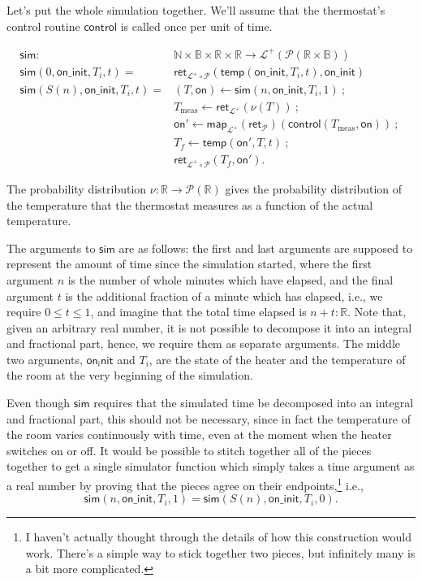 \documentclass{article}           %
\newcommand{\R}{\mathbb{R}}
\newcommand{\nat}{\mathbb{N}}
\newcommand{\bool}{\mathbb{B}}
\newcommand{\Prob}{\mathcal{P}}
\newcommand{\PLower}{\mathcal{L}^+}
\newcommand{\map}[1]{\mathsf{map}_{#1}}
\newcommand{\ret}[1]{\mathsf{ret}_{#1}}
\newcommand{\then}{\ ;\ }
\begin{document}
Let's put the whole simulation together. We'll assume that the thermostat's control routine $\mathsf{control}$ is called once per unit of time.

\begin{align*}
\mathsf{sim} :\ & \nat \times \bool \times \R \times \R \to \PLower(\Prob(\R \times \bool))
\\
\mathsf{sim}(0, \mathsf{on\_init}, T_i, t) = 
  &\ret{\PLower \circ \Prob}(\mathsf{temp}(\mathsf{on\_init}, T_i, t), \mathsf{on\_init})
\\
\mathsf{sim}(S(n), \mathsf{on\_init}, T_i, t) = 
&(T, \mathsf{on}) \leftarrow \mathsf{sim}(n, \mathsf{on\_init}, T_i, 1)
 \then
 \\&T_\text{meas} \leftarrow \ret{\PLower}(\nu(T))
 \then
 \\ &\mathsf{on}' \leftarrow \map{\PLower}(\ret{\Prob})(\mathsf{control}(T_\text{meas}, \mathsf{on}))
 \then
 \\ &T_f \leftarrow \mathsf{temp}(\mathsf{on'}, T, t)
 \then
 \\ &\ret{\PLower \circ \Prob}(T_f, \mathsf{on'}).
\end{align*}

The probability distribution $\nu : \R \to \Prob(\R)$ gives the probability distribution of the temperature that the thermostat measures as a function of the actual temperature.

The arguments to $\mathsf{sim}$ are as follows: the first and last arguments are supposed to represent the amount of time since the simulation started, where the first argument $n$ is the number of whole minutes which have elapsed, and the final argument $t$ is the additional fraction of a minute which has elapsed, i.e., we require $0 \le t \le 1$, and imagine that the total time elapsed is $n + t : \R$. Note that, given an arbitrary real number, it is not possible to decompose it into an integral and fractional part, hence, we require them as separate arguments. The middle two arguments, $\mathsf{on_init}$ and $T_i$, are the state of the heater and the temperature of the room at the very beginning of the simulation.

Even though $\mathsf{sim}$ requires that the simulated time be decomposed into an integral and fractional part, this should not be necessary, since in fact the temperature of the room varies continuously with time, even at the moment when the heater switches on or off. It would be possible to stitch together all of the pieces together to get a single simulator function which simply takes a time argument as a real number by proving that the pieces agree on their endpoints,\footnote{I haven't actually thought through the details of how this construction would work. There's a simple way to stick together two pieces, but infinitely many is a bit more complicated.} i.e.,
\[
\mathsf{sim}(n, \mathsf{on\_init}, T_i, 1) = \mathsf{sim}(S(n), \mathsf{on\_init}, T_i, 0).
\]
\end{document}
